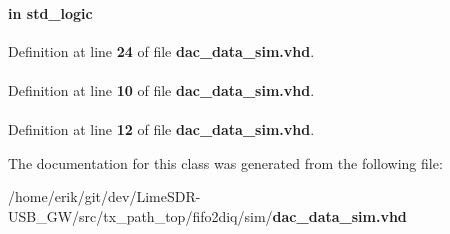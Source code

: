 \paragraph[{reset\+\_\+n}]{ {\bfseries \textcolor{keywordflow}{in}\textcolor{vhdlchar}{ }} {\bfseries \textcolor{comment}{std\+\_\+logic}\textcolor{vhdlchar}{ }} \hspace{0.3cm}{\ttfamily [Port]}}\label{classdac__data__sim_a446ea52ed8c4a84181a47d9165ce41a5}


Definition at line {\bf 24} of file {\bf dac\+\_\+data\+\_\+sim.\+vhd}.

\paragraph[{std\+\_\+logic\+\_\+1164}]{\hspace{0.3cm}{\ttfamily [Package]}}\label{classdac__data__sim_acd03516902501cd1c7296a98e22c6fcb}


Definition at line {\bf 10} of file {\bf dac\+\_\+data\+\_\+sim.\+vhd}.

\paragraph[{textio}]{\hspace{0.3cm}{\ttfamily [Package]}}\label{classdac__data__sim_aa8c4e25998323a84db5b1fa701b92fcb}


Definition at line {\bf 12} of file {\bf dac\+\_\+data\+\_\+sim.\+vhd}.



The documentation for this class was generated from the following file\+:\begin{DoxyCompactItemize}
\item 
/home/erik/git/dev/\+Lime\+S\+D\+R-\/\+U\+S\+B\+\_\+\+G\+W/src/tx\+\_\+path\+\_\+top/fifo2diq/sim/{\bf dac\+\_\+data\+\_\+sim.\+vhd}\end{DoxyCompactItemize}
